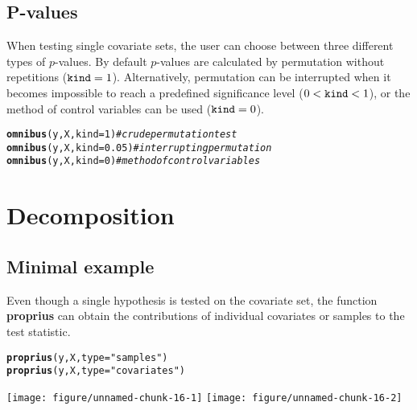 \documentclass{article}\usepackage[]{graphicx}\usepackage[]{color}
\makeatletter
\def\maxwidth{ %
  \ifdim\Gin@nat@width>\linewidth
    \linewidth
  \else
    \Gin@nat@width
  \fi
}
\newcommand{\hlnum}[1]{\textcolor[rgb]{0.686,0.059,0.569}{#1}}%
\newcommand{\hlstr}[1]{\textcolor[rgb]{0.192,0.494,0.8}{#1}}%
\newcommand{\hlcom}[1]{\textcolor[rgb]{0.678,0.584,0.686}{\textit{#1}}}%
\newcommand{\hlstd}[1]{\textcolor[rgb]{0.345,0.345,0.345}{#1}}%
\newcommand{\hlkwc}[1]{\textcolor[rgb]{0.333,0.667,0.333}{#1}}%
\newcommand{\hlkwd}[1]{\textcolor[rgb]{0.737,0.353,0.396}{\textbf{#1}}}%
\newenvironment{kframe}{%
 \def\at@end@of@kframe{}%
 \ifinner\ifhmode%
  \def\at@end@of@kframe{\end{minipage}}%
  \begin{minipage}{\columnwidth}%
 \fi\fi%
 \def\FrameCommand##1{\hskip\@totalleftmargin \hskip-\fboxsep
 \colorbox{shadecolor}{##1}\hskip-\fboxsep
     \hskip-\linewidth \hskip-\@totalleftmargin \hskip\columnwidth}%
 \MakeFramed {\advance\hsize-\width
   \@totalleftmargin\z@ \linewidth\hsize
   \@setminipage}}%
 {\par\unskip\endMakeFramed%
 \at@end@of@kframe}
\newenvironment{knitrout}{}{} %
\makeatother
\begin{document}
\subsection{P-values}
\label{omnibus_p_values}

When testing single covariate sets, the user can choose between three different types of \mbox{$p$-values}. By default \mbox{$p$-values} are calculated by permutation without repetitions (${\verb+kind+=1}$). Alternatively, permutation can be interrupted when it becomes impossible to reach a predefined significance level (${0 < \verb+kind+ < 1}$), or the method of control variables can be used (${\verb+kind+=0}$).

\begin{knitrout}
\color{fgcolor}\begin{kframe}
\begin{alltt}
\hlkwd{omnibus}\hlstd{(y,X,}\hlkwc{kind}\hlstd{=}\hlnum{1}\hlstd{)} \hlcom{# crude permutation test}
\hlkwd{omnibus}\hlstd{(y,X,}\hlkwc{kind}\hlstd{=}\hlnum{0.05}\hlstd{)} \hlcom{# interrupting permutation}
\hlkwd{omnibus}\hlstd{(y,X,}\hlkwc{kind}\hlstd{=}\hlnum{0}\hlstd{)} \hlcom{# method of control variables}
\end{alltt}
\end{kframe}
\end{knitrout}

\newpage %
\section{Decomposition} %
\label{proprius} %

\subsection{Minimal example}
\label{proprius_minimal_example}

Even though a single hypothesis is tested on the covariate set, the function \textbf{proprius} can obtain the contributions of individual covariates or samples to the test statistic. 
\begin{knitrout}
\color{fgcolor}\begin{kframe}
\begin{alltt}
\hlkwd{proprius}\hlstd{(y,X,}\hlkwc{type}\hlstd{=}\hlstr{"samples"}\hlstd{)}
\hlkwd{proprius}\hlstd{(y,X,}\hlkwc{type}\hlstd{=}\hlstr{"covariates"}\hlstd{)}
\end{alltt}
\end{kframe}
\texttt{[image: figure/unnamed-chunk-16-1]} 
\texttt{[image: figure/unnamed-chunk-16-2]} 

\end{knitrout}
\end{document}
